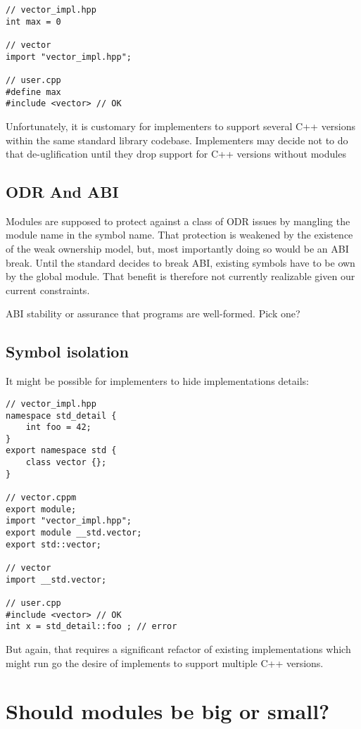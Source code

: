 \documentclass{wg21}
\begin{document}
\begin{lstlisting}[style=color]
// vector_impl.hpp
int max = 0

// vector
import "vector_impl.hpp";

// user.cpp
#define max
#include <vector> // OK
\end{lstlisting}

Unfortunately, it is customary for implementers to support several C++ versions
within the same standard library codebase.
Implementers may decide not to do that de-uglification until they drop support for C++  versions without modules


\subsection{ODR And ABI}

Modules are supposed to protect against a class of ODR issues by mangling the module name in the symbol name.
That protection is weakened by the existence of the weak ownership model, but, most importantly doing so would be an ABI break.
Until the standard decides to break ABI, existing symbols have to be own by the global module.
That benefit is therefore not currently realizable given our current constraints.

ABI stability or assurance that programs are well-formed. Pick one? 


\subsection{Symbol isolation}

It might be possible for implementers to hide implementations details:

\begin{lstlisting}[style=color]
// vector_impl.hpp
namespace std_detail {
    int foo = 42;
}
export namespace std {
    class vector {};
}

// vector.cppm
export module;
import "vector_impl.hpp";
export module __std.vector;
export std::vector;

// vector
import __std.vector;

// user.cpp
#include <vector> // OK
int x = std_detail::foo ; // error
\end{lstlisting}

But again, that requires a significant refactor of existing implementations which might run go the desire of
implements to support multiple C++ versions.


\section{Should modules be big or small?}
\end{document}
